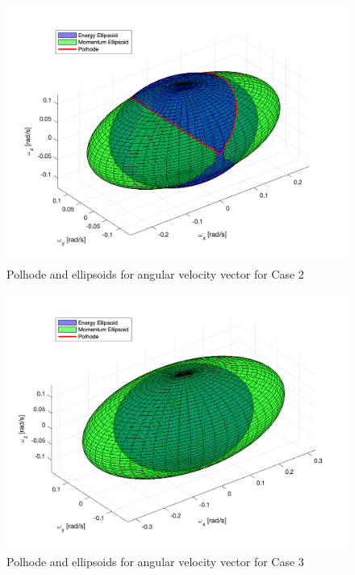 \begin{figure}[H]
\centering
\includegraphics[scale=0.6]{Images/ps2_problem9_p7_y.png}
\caption{Polhode and ellipsoids for angular velocity vector for Case 2}
\label{fig:ps2_problem9_p7_y}
\end{figure}

\begin{figure}[H]
\centering
\includegraphics[scale=0.6]{Images/ps2_problem9_p7_z.png}
\caption{Polhode and ellipsoids for angular velocity vector for Case 3}
\label{fig:ps2_problem9_p7_z}
\end{figure}

